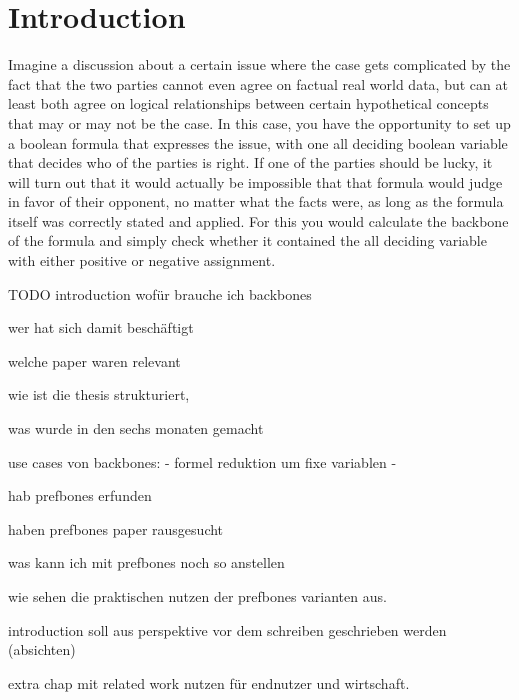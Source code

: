 \chapter{Introduction}
 Imagine a discussion about a certain issue where the case gets complicated by the fact that the two parties cannot even agree on factual real world data, but can at least both agree on logical relationships between certain hypothetical concepts that may or may not be the case. In this case, you have the opportunity to set up a boolean formula that expresses the issue, with one all deciding boolean variable that decides who of the parties is right. If one of the parties should be lucky, it will turn out that it would actually be impossible that that formula would judge in favor of their opponent, no matter what the facts were, as long as the formula itself was correctly stated and applied. For this you would calculate the backbone of the formula and simply check whether it contained the all deciding variable with either positive or negative assignment. 


TODO introduction
wofür brauche ich backbones

wer hat sich damit beschäftigt

welche paper waren relevant

wie ist die thesis strukturiert, 

was wurde in den sechs monaten gemacht


use cases von backbones:
- formel reduktion um fixe variablen
- 



hab prefbones erfunden

haben prefbones paper rausgesucht

was kann ich mit prefbones noch so anstellen

wie sehen die praktischen nutzen der prefbones varianten aus.



introduction soll aus perspektive vor dem schreiben geschrieben werden (absichten)

extra chap mit related work
nutzen für endnutzer und wirtschaft.
